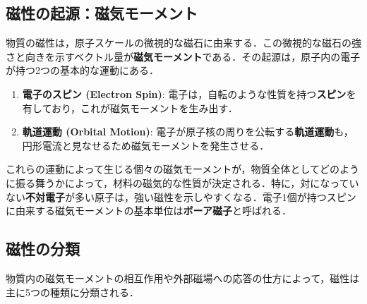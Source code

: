 \documentclass[11pt,a4paper]{ltjsarticle}
\newcommand{\supcite}[1]{\textsuperscript{\cite{#1}}}
\begin{document}
\subsection{磁性の起源：磁気モーメント}

物質の磁性は，原子スケールの微視的な磁石に由来する．この微視的な磁石の強さと向きを示すベクトル量が\textbf{磁気モーメント}である．その起源は，原子内の電子が持つ2つの基本的な運動にある\supcite{ref1}．

\begin{enumerate}
\item \textbf{電子のスピン (Electron Spin)}: 電子は，自転のような性質を持つ\textbf{スピン}を有しており，これが磁気モーメントを生み出す．
\item \textbf{軌道運動 (Orbital Motion)}: 電子が原子核の周りを公転する\textbf{軌道運動}も，円形電流と見なせるため磁気モーメントを発生させる．
\end{enumerate}

これらの運動によって生じる個々の磁気モーメントが，物質全体としてどのように振る舞うかによって，材料の磁気的な性質が決定される．特に，対になっていない\textbf{不対電子}が多い原子は，強い磁性を示しやすくなる．電子1個が持つスピンに由来する磁気モーメントの基本単位は\textbf{ボーア磁子}と呼ばれる\supcite{ref1}．

\subsection{磁性の分類}

物質内の磁気モーメントの相互作用や外部磁場への応答の仕方によって，磁性は主に5つの種類に分類される．
\end{document}
